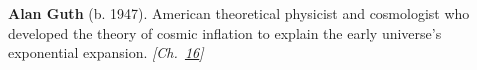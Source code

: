\textbf{Alan Guth} (b. 1947). American theoretical physicist and cosmologist who developed the theory of cosmic inflation to explain the early universe's exponential expansion. \emph{[Ch.~\hyperref[ch:falsevacuumthreat]{16}]}


